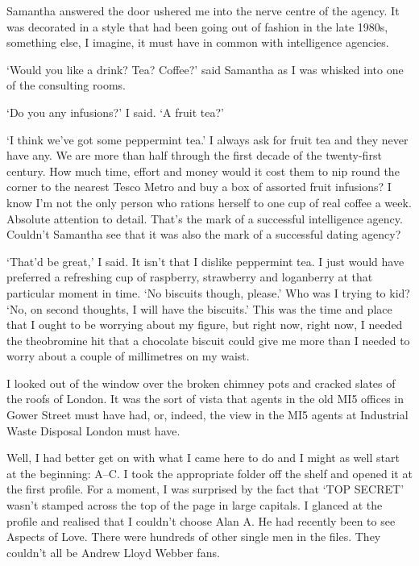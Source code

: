Samantha answered the door ushered me into the nerve centre of the
agency. It was decorated in a style that had been going out of
fashion in the late 1980s, something else, I imagine, it must have
in common with intelligence agencies.

`Would you like a drink? Tea? Coffee?' said Samantha as I was
whisked into one of the consulting rooms.

`Do you any infusions?' I said. `A fruit tea?'

`I think we've got some peppermint tea.' I always ask for fruit tea
and they never have any. We are more than half through the first
decade of the twenty-first century. How much time, effort and money
would it cost them to nip round the corner to the nearest Tesco
Metro and buy a box of assorted fruit infusions? I know I'm not the
only person who rations herself to one cup of real coffee a week.
Absolute attention to detail. That's the mark of a successful
intelligence agency. Couldn't Samantha see that it was also the mark
of a successful dating agency?

`That'd be great,' I said. It isn't that I dislike peppermint tea. I
just would have preferred a refreshing cup of raspberry, strawberry
and loganberry at that particular moment in time. `No biscuits
though, please.' Who was I trying to kid? `No, on second thoughts, I will
have the biscuits.' This was the time and place that I ought to be
worrying about my figure, but right now, right now, I needed the
theobromine hit that a chocolate biscuit could give me more than I
needed to worry about a couple of millimetres on my waist.

I looked out of the window over the broken chimney pots and cracked
slates of the roofs of London. It was the sort of vista that
agents in the old MI5 offices in Gower Street must have had, or, indeed, the view in the MI5 agents at Industrial Waste Disposal London must have.

Well, I had better get on with what I came here to do and I might as
well start at the beginning: A--C. I took the appropriate folder off
the shelf and opened it at the first profile. For a moment, I was
surprised by the fact that `TOP SECRET' wasn't stamped across the
top of the page in large capitals. I glanced at the profile and
realised that I couldn't choose Alan A. He had recently been to see
{\twelvesl Aspects of Love}. There were hundreds of other single men
in the files. They couldn't all be Andrew Lloyd Webber fans.

